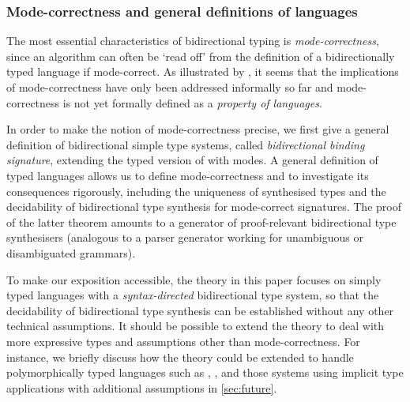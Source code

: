 

\subsubsection{Mode-correctness and general definitions of languages}
\label{sec:language-formalisation}
The most essential characteristics of bidirectional typing is \emph{mode-correctness}, since an algorithm can often be `read off' from the definition of a bidirectionally typed language if mode-correct.
As illustrated by \citet{Dunfield2021}, it seems that the implications of mode-correctness have only been addressed informally so far and mode-correctness is not yet formally defined as a \emph{property of languages}.

In order to make the notion of mode-correctness precise, we first give a general definition of bidirectional simple type systems, called \emph{bidirectional binding signature}, extending the typed version of  with modes.
A general definition of typed languages allows us to define mode-correctness and to investigate its consequences rigorously, including the uniqueness of synthesised types and the decidability of bidirectional type synthesis for mode-correct signatures.
The proof of the latter theorem amounts to a generator of proof-relevant bidirectional type synthesisers (analogous to a parser generator working for unambiguous or disambiguated grammars).

To make our exposition accessible, the theory in this paper focuses on simply typed languages with a \emph{syntax-directed} bidirectional type system, so that the decidability of bidirectional type synthesis can be established without any other technical assumptions.
It should be possible to extend the theory to deal with more expressive types and assumptions other than mode-correctness.
For instance, we briefly discuss how the theory could be extended to handle polymorphically typed languages such as \SystemF, \SystemFsub, and those systems using implicit type applications with additional assumptions in \cref{sec:future}.

